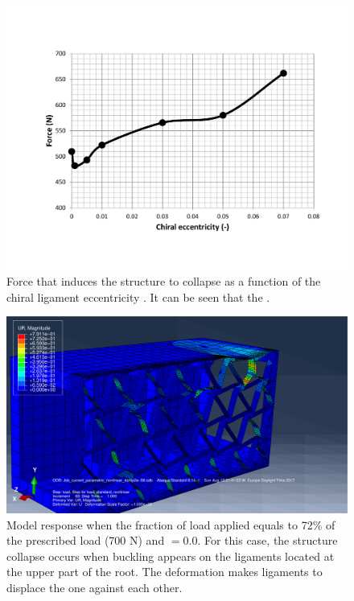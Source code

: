       \begin{figure}[!htpb] %
        \centering
        \includegraphics[width=0.8 \textwidth]{../figures/result-sim/eccen/force_e}
        \caption[Force that induces the structure to collapse as a function of the chiral ligament eccentricity]{Force that induces the structure to collapse as a function of the chiral ligament eccentricity \chie. It can be seen that the .}
        \label{fig:force_e}
      \end{figure}

      \begin{figure}[!htpb] %
        \centering
        \includegraphics[width=0.8 \textwidth]{../figures/result-sim/eccen/0coma0_UR}
        \caption[Model response when the fraction of load applied equals to 72\% of the prescribed load (700 N) and \chie$= 0.0$]{Model response when the fraction of load applied equals to 72\% of the prescribed load (700 N) and \chie$= 0.0$. For this case, the structure collapse occurs when buckling appears on the ligaments located at the upper part of the root. The deformation makes ligaments to displace the one against each other.}
        \label{fig:0coma0_UR}
      \end{figure}

